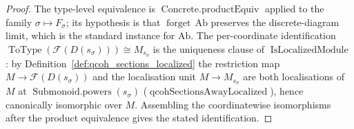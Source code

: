 \begin{proof}
  The type-level equivalence is \(\operatorname{Concrete.productEquiv}\) applied to the
  family \(\sigma \mapsto F_\sigma\); its hypothesis is that
  \(\operatorname{forget}\,\mathrm{Ab}\) preserves the discrete-diagram limit, which is
  the standard instance for \(\mathrm{Ab}\). The per-coordinate identification
  \(\operatorname{ToType}(\mathcal{F}(D(s_\sigma))) \cong M_{s_\sigma}\) is the
  uniqueness clause of \(\operatorname{IsLocalizedModule}\): by
  Definition~\ref{def:qcoh_sections_localized} the restriction map
  \(M \to \mathcal{F}(D(s_\sigma))\) and the localisation unit
  \(M \to M_{s_\sigma}\) are both localisations of \(M\) at
  \(\operatorname{Submonoid.powers}(s_\sigma)\)
  (\(\operatorname{qcohSectionsAwayLocalized}\)), hence canonically isomorphic over
  \(M\). Assembling the coordinatewise isomorphisms after the product equivalence gives
  the stated identification.
\end{proof}

